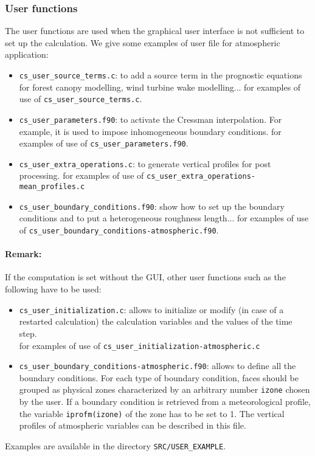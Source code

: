 \subsubsection{User functions}
%
The user functions are used when the graphical user interface is not
sufficient to set up the calculation. We give some examples of user file for
atmospheric application:
\begin{itemize}
\item \texttt{cs\_user\_source\_terms.c}: to add a source term in the
prognostic equations for forest canopy modelling, wind turbine wake modelling...
for examples of use of \texttt{cs\_user\_source\_terms.c}.
\item \texttt{cs\_user\_parameters.f90}: to activate the Cressman interpolation.
For example, it is used to impose inhomogeneous boundary conditions.%
for examples of use of \texttt{cs\_user\_parameters.f90}.
\item \texttt{cs\_user\_extra\_operations.c}: to generate vertical
profiles for post processing. %
for examples of use of \texttt{cs\_user\_extra\_operations-mean\_profiles.c}
\item \texttt{cs\_user\_boundary\_conditions.f90}: show how to set
up the boundary conditions and to put a heterogeneous roughness length...
for examples of use of \texttt{cs\_user\_boundary\_conditions-atmospheric.f90}.
\end{itemize}
%
\paragraph{Remark:}
If the computation is set without the GUI, other user functions such as the
following have to be used:
\begin{itemize}
\item \texttt{cs\_user\_initialization.c}: allows to initialize
or modify (in case of a restarted calculation) the calculation variables and
the values of the time step. %
\\for examples of use of \texttt{cs\_user\_initialization-atmospheric.c}
\item \texttt{cs\_user\_boundary\_conditions-atmospheric.f90}: allows to define
all the boundary conditions. For each type of boundary condition, faces should
be grouped as physical zones characterized by an arbitrary number \texttt{izone}
chosen by the user. If a boundary condition is retrieved from a meteorological
profile, the variable \texttt{iprofm(izone)} of the zone has to be set to 1.
The vertical profiles of atmospheric variables can be described in this file.
\end{itemize}
%
Examples are available in the directory \texttt{SRC/USER\_EXAMPLE}.
%
